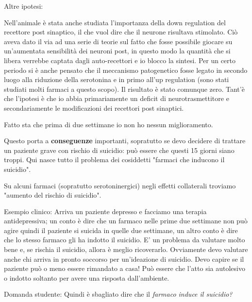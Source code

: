 \documentclass[]{article}
\begin{document}
Altre ipotesi:

Nell'animale è stata anche studiata l'importanza della down regulation
del recettore post sinaptico, il che vuol dire che il neurone risultava
stimolato. Ciò aveva dato il via ad una serie di teorie sul fatto che
fosse possibile giocare su un'aumentata sensibilità dei neuroni post, in
questo modo la quantità che si libera verrebbe captata dagli
auto-recettori e io blocco la sintesi. Per un certo periodo si è anche
pensato che il meccanismo patogenetico fosse legato in secondo luogo
alla riduzione della serotonina e in primo all'up regulation (sono stati
studiati molti farmaci a questo scopo). Il risultato è stato comunque
zero. Tant'è che l'ipotesi è che io abbia primariamente un deficit di
neurotrasmettitore e secondariamente le modificazioni dei recettori post
sinaptici.

Fatto sta che prima di due settimane io non ho nessun miglioramento.

Questo porta a \textbf{conseguenze} importanti, sopratutto se devo
decidere di trattare un paziente grave con rischio di suicidio: può
essere che questi 15 giorni siano troppi. Qui nasce tutto il problema
dei cosiddetti "farmaci che inducono il suicidio".

Su alcuni farmaci (sopratutto serotoninergici) negli effetti collaterali
troviamo "aumento del rischio di suicidio".

Esempio clinico: Arriva un paziente depresso e facciamo una terapia
antidepressiva; un conto è dire che un farmaco nelle prime due settimane
non può agire quindi il paziente si suicida in quelle due settimane, un
altro conto è dire che lo stesso farmaco gli ha indotto il suicidio. E'
un problema da valutare molto bene e, se rischia il suicidio, allora è
meglio ricoverarlo. Ovviamente devo valutare anche chi arriva in pronto
soccorso per un'ideazione di suicidio. Devo capire se il paziente può o
meno essere rimandato a casa! Può essere che l'atto sia autolesivo o
indotto soltanto per avere una risposta dall'ambiente.

Domanda studente: Quindi è sbagliato dire che il \emph{farmaco induce il
suicidio?}
\end{document}
